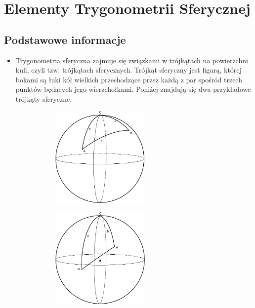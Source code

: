 \documentclass[10pt, twoside, fleqn]{article}
\begin{document}
		\newpage
			\section{Elementy Trygonometrii Sferycznej}

\subsection{Podstawowe informacje}
	
			\begin{itemize}
				\item 	Trygonometria sferyczna zajmuje się związkami w trójkątach 
						na powierzchni kuli, czyli tzw. trójkątach sferycznych. 
						Trójkąt sferyczny jest figurą, której bokami są łuki 
						kół wielkich przechodzące przez każdą z par spośród trzech
						punktów będących jego wierzchołkami. Poniżej znajdują
						się dwa przykładowe trójkąty sferyczne.
											
					\vspace{5pt}	
					\begin{figure}[h!]
						\centering
						\begin{subfigure}{.5\textwidth}
							\centering
  							\includegraphics[height=140pt]
  											{trojkat_sferyczny1.pdf}
						\end{subfigure}%
						\begin{subfigure}{.5\textwidth}
							\centering
  							\includegraphics[height=140pt]
  											{trojkat_sferyczny2.pdf}							
						\end{subfigure}
					\end{figure}


\end{itemize}
\end{document}
